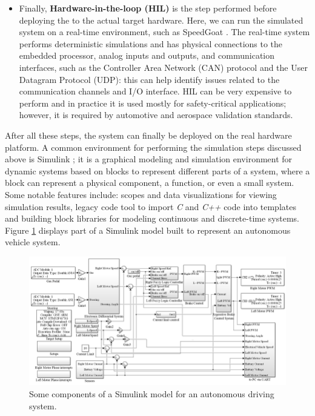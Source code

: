 \begin{itemize}
    \item Finally, \textbf{Hardware-in-the-loop (HIL)} is the step performed before deploying the \es to the actual target hardware. Here, we can run the simulated system on a real-time environment, such as SpeedGoat \cite{SpeedGoat}. The real-time system performs deterministic simulations and has physical connections to the embedded processor, \ie analog inputs and outputs, and communication interfaces, such as the Controller Area Network (CAN) protocol and the User Datagram Protocol (UDP): this can help identify issues related to the communication channels and I/O interface. HIL can be very expensive to perform and in practice it is used mostly for safety-critical applications; however, it is required by automotive and aerospace validation standards. 
\end{itemize}

\noindent After all these steps, the system can finally be deployed on the real hardware platform. A common environment for performing the simulation steps discussed above is Simulink \cite{Simulink}; it is a graphical modeling and simulation environment for dynamic systems based on blocks to represent different parts of a system, where a block can represent a physical component, a function, or even a small system. Some notable features include: scopes and data visualizations for viewing simulation results, legacy code tool to import \textit{C} and \textit{C++} code into templates and building block libraries for modeling continuous and discrete-time systems.
Figure \ref{simulink_model} displays part of a Simulink model built to represent an autonomous vehicle system.

\begin{figure}[H]
    \centering
    \includegraphics[width=\linewidth]{figures/simulink_model.png}
    \caption{Some components of a Simulink model for an autonomous driving system.}
    \label{simulink_model}
\end{figure}


